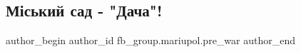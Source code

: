  
 
 
 
 

\subsection{Міський сад - "Дача"!}
\label{sec:04_02_2023.fb.fb_group.mariupol.pre_war.2.m_skii_sad____dacha_}

\ifcmt
 author_begin
   author_id fb_group.mariupol.pre_war
 author_end
\fi
